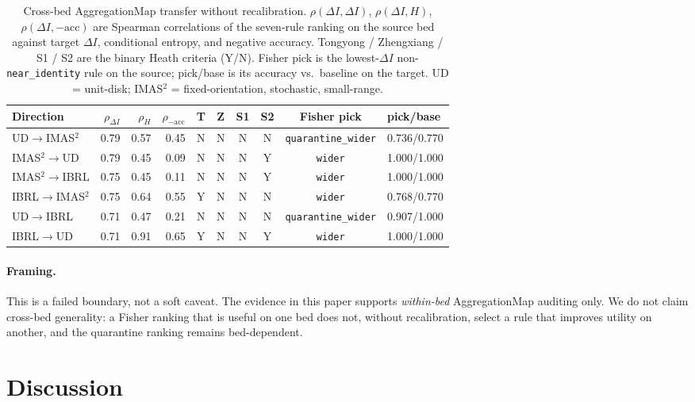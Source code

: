 \documentclass[11pt,a4paper]{article}
\begin{document}
\begin{table}[t]
\centering
\footnotesize
\caption{Cross-bed AggregationMap transfer without recalibration. $\rho(\Delta I,\Delta I)$, $\rho(\Delta I,H)$, $\rho(\Delta I,-\mathrm{acc})$ are Spearman correlations of the seven-rule ranking on the source bed against target $\Delta I$, conditional entropy, and negative accuracy. Tongyong / Zhengxiang / S1 / S2 are the binary Heath criteria (Y/N). Fisher pick is the lowest-$\Delta I$ non-\texttt{near\_identity} rule on the source; pick/base is its accuracy vs.\ baseline on the target. UD = unit-disk; IMAS$^2$ = fixed-orientation, stochastic, small-range.}
\label{tab:cross-bed}
\begin{tabular}{lrrrcccccl}
\toprule
Direction & $\rho_{\Delta I}$ & $\rho_H$ & $\rho_{-\mathrm{acc}}$ & T & Z & S1 & S2 & Fisher pick & pick/base \\
\midrule
UD$\to$IMAS$^2$ & 0.79 & 0.57 & 0.45 & N & N & N & N & \texttt{quarantine\_wider} & 0.736/0.770 \\
IMAS$^2\to$UD & 0.79 & 0.45 & 0.09 & N & N & N & Y & \texttt{wider} & 1.000/1.000 \\
IMAS$^2\to$IBRL & 0.75 & 0.45 & 0.11 & N & N & N & Y & \texttt{wider} & 1.000/1.000 \\
IBRL$\to$IMAS$^2$ & 0.75 & 0.64 & 0.55 & Y & N & N & N & \texttt{wider} & 0.768/0.770 \\
UD$\to$IBRL & 0.71 & 0.47 & 0.21 & N & N & N & N & \texttt{quarantine\_wider} & 0.907/1.000 \\
IBRL$\to$UD & 0.71 & 0.91 & 0.65 & Y & N & N & Y & \texttt{wider} & 1.000/1.000 \\
\bottomrule
\end{tabular}
\end{table}

\paragraph{Framing.}
This is a failed boundary, not a soft caveat. The evidence in this paper
supports \emph{within-bed} AggregationMap auditing only. We do not claim
cross-bed generality: a Fisher ranking that is useful on one bed does not,
without recalibration, select a rule that improves utility on another, and
the quarantine ranking remains bed-dependent.

\section{Discussion}
\label{sec:discussion}
\end{document}
